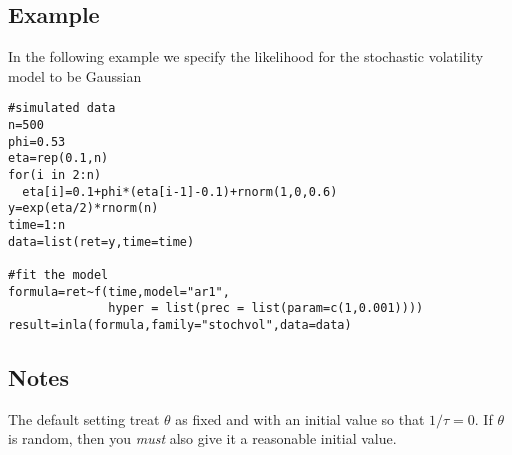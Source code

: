 \documentclass[a4paper,11pt]{article}
\begin{document}
\subsection*{Example}
In the following example we specify the likelihood for the stochastic
volatility model to be Gaussian
 
\begin{verbatim}
#simulated data
n=500
phi=0.53
eta=rep(0.1,n)
for(i in 2:n)
  eta[i]=0.1+phi*(eta[i-1]-0.1)+rnorm(1,0,0.6)
y=exp(eta/2)*rnorm(n)
time=1:n
data=list(ret=y,time=time)

#fit the model
formula=ret~f(time,model="ar1",
              hyper = list(prec = list(param=c(1,0.001))))
result=inla(formula,family="stochvol",data=data)

\end{verbatim}

\subsection*{Notes}

The default setting treat $\theta$ as fixed and with an initial value
so that $1/\tau=0$.  If $\theta$ is random, then you \emph{must} also
give it a reasonable initial value.
\end{document}
